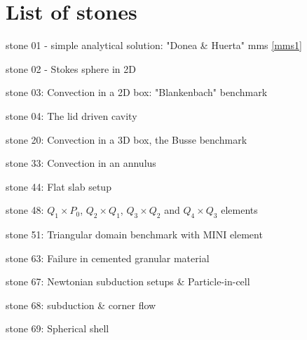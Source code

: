 \section{List of stones} %


{\small 

\noindent stone 01 - simple analytical solution: "Donea \& Huerta" mms \ref{mms1} 


\noindent stone 02 - Stokes sphere in 2D 


\noindent stone 03: Convection in a 2D box: "Blankenbach" benchmark \cite{blbc89}


\noindent stone 04: The lid driven cavity


\noindent stone 20: Convection in a 3D box, the Busse benchmark \cite{bucc93}



\noindent stone 33: Convection in an annulus 


\noindent stone 44: Flat slab setup 


\noindent stone 48: $Q_1\times P_0$, $Q_2\times Q_1$, $Q_3\times Q_2$ and $Q_4\times Q_3$ elements


\noindent stone 51: Triangular domain benchmark with MINI element


\noindent stone 63: Failure in cemented granular material


\noindent stone 67: Newtonian subduction setups \& Particle-in-cell


\noindent stone 68: subduction \& corner flow


\noindent stone 69: Spherical shell 


}









